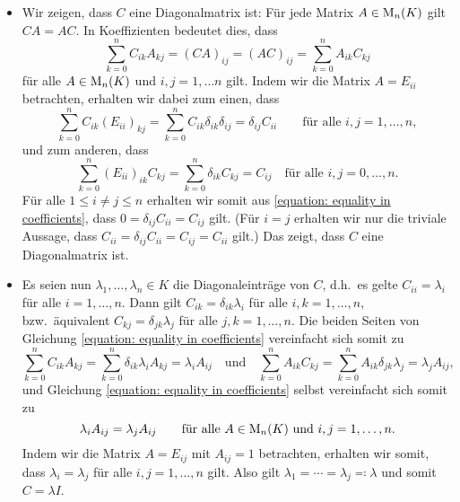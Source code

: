 \begin{itemize}
  \item
    Wir zeigen, dass $C$ eine Diagonalmatrix ist:
    Für jede Matrix $A \in \operatorname{M}_{n}(K)$ gilt $CA = AC$.
    In Koeffizienten bedeutet dies, dass
    \begin{equation}
      \label{equation: equality in coefficients}
        \sum_{k=0}^n C_{ik} A_{kj}
      = (CA)_{ij}
      = (AC)_{ij}
      = \sum_{k=0}^n A_{ik} C_{kj}
    \end{equation}
    für alle $A \in \operatorname{M}_{n}(K)$ und $i,j = 1, \dotsc n$ gilt.
    Indem wir die Matrix $A  = E_{ii}$ betrachten, erhalten wir dabei zum einen, dass
    \[
        \sum_{k=0}^n C_{ik} (E_{ii})_{kj}
      = \sum_{k=0}^n C_{ik} \delta_{ik} \delta_{ij}
      = \delta_{ij} C_{ii}
      \qquad
      \text{für alle $i, j = 1, \dotsc, n$},
    \]
    und zum anderen, dass
    \[
          \sum_{k=0}^n (E_{ii})_{ik} C_{kj}
        = \sum_{k=0}^n \delta_{ik} C_{kj}
        = C_{ij}
        \quad
        \text{für alle $i, j = 0, \dotsc, n$}.
    \]
    Für alle $1 \leq i \neq j \leq n$ erhalten wir somit aus \eqref{equation: equality in coefficients}, dass $0 = \delta_{ij} C_{ii} = C_{ij}$ gilt.
    (Für $i = j$ erhalten wir nur die triviale Aussage, dass $C_{ii} = \delta_{ij} C_{ii} = C_{ij} = C_{ii}$ gilt.)
    Das zeigt, dass $C$ eine Diagonalmatrix ist.
    
  \item
    Es seien nun $\lambda_1, \dotsc, \lambda_n \in K$ die Diagonaleinträge von $C$, d.h.\ es gelte $C_{ii} = \lambda_i$ für alle $i = 1, \dotsc, n$.
    Dann gilt $C_{ik} = \delta_{ik} \lambda_i$ für alle $i, k = 1, \dotsc, n$, bzw.\ äquivalent $C_{kj} = \delta_{jk} \lambda_j$ für alle $j, k = 1, \dotsc, n$.
    Die beiden Seiten von Gleichung \eqref{equation: equality in coefficients} vereinfacht sich somit zu
    \[
        \sum_{k=0}^n C_{ik} A_{kj}
      = \sum_{k=0}^n \delta_{ik} \lambda_i A_{kj}
      = \lambda_i A_{ij}
      \quad\text{und}\quad
        \sum_{k=0}^n A_{ik} C_{kj}
      = \sum_{k=0}^n A_{ik} \delta_{jk} \lambda_j
      = \lambda_j A_{ij},
    \]
    und Gleichung \eqref{equation: equality in coefficients} selbst vereinfacht sich somit zu
    \[
        \lambda_i A_{ij}
      = \lambda_j A_{ij}
      \qquad
      \text{für alle $A \in \operatorname{M}_{n}(K)$ und $i, j = 1, \dotsc, n$}.
    \]
    Indem wir die Matrix $A = E_{ij}$ mit $A_{ij} = 1$ betrachten, erhalten wir somit, dass $\lambda_i = \lambda_j$ für alle $i,j = 1, \dotsc, n$ gilt.
    Also gilt $\lambda_1 = \dotsb = \lambda_j \eqqcolon \lambda$ und somit $C = \lambda I$.
\end{itemize}



